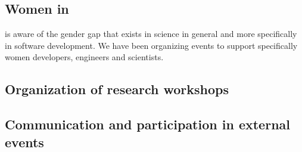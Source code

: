 \documentclass{deliverablereport}
\begin{document}
\subsection{Women in \ODK}

\ODK is aware of the gender gap that exists in science in general
and more specifically in software development. We have been organizing
events to support specifically women developers, engineers and scientists.



\subsection{Organization of research workshops}



\subsection{Communication and participation in external events}





\end{document}
